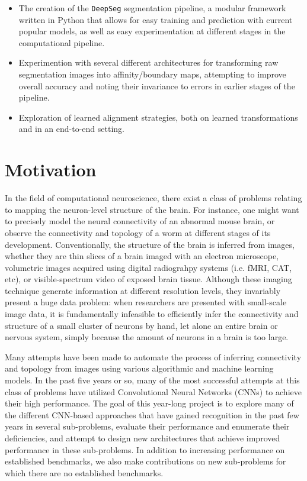 \begin{itemize}
\item The creation of the \texttt{DeepSeg} segmentation pipeline, a modular framework written in Python that allows for easy training and prediction with current popular models, as well as easy experimentation at different stages in the computational pipeline.
\item Experimention with several different architectures for transforming raw segmentation images into affinity/boundary maps, attempting to improve overall accuracy and noting their invariance to errors in earlier stages of the pipeline.
\item Exploration of learned alignment strategies, both on learned transformations and in an end-to-end setting.
\end{itemize}

\section{Motivation}

In the field of computational neuroscience, there exist a class of problems relating to mapping the neuron-level structure of the brain. For instance, one might want to precisely model the neural connectivity of an abnormal mouse brain, or observe the connectivity and topology of a worm at different stages of its development. Conventionally, the structure of the brain is inferred from images, whether they are thin slices of a brain imaged with an electron microscope, volumetric images acquired using digital radiograhpy systems (i.e. fMRI, CAT, etc), or visible-spectrum video of exposed brain tissue. Although these imaging technique generate information at different resolution levels, they invariably present a huge data problem: when researchers are presented with small-scale image data, it is fundamentally infeasible to efficiently infer the connectivity and structure of a small cluster of neurons by hand, let alone an entire brain or nervous system, simply because the amount of neurons in a brain is too large.

Many attempts have been made to automate the process of inferring connectivity and topology from images using various algorithmic and machine learning models. In the past five years or so, many of the most successful attempts at this class of problems have utilized Convolutional Neural Networks (CNNs) to achieve their high performance. The goal of this year-long project is to explore many of the different CNN-based approaches that have gained recognition in the past few years in several sub-problems, evaluate their performance and enumerate their deficiencies, and attempt to design new architectures that achieve improved performance in these sub-problems. In addition to increasing performance on established benchmarks, we also make contributions on new sub-problems for which there are no established benchmarks.

